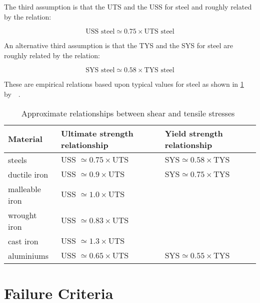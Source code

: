 The third assumption is that the \acf{UTS} and the \acf{USS} for steel and roughly related by the relation:

\begin{equation}
  \text{USS steel} \simeq 0.75 \times \text{UTS steel}
\end{equation}

An alternative third assumption is that the \acf{TYS} and the \acf{SYS} for steel are roughly related by the relation:

\begin{equation}
  \text{SYS steel} \simeq 0.58 \times \text{TYS steel}
\end{equation}

These are empirical relations based upon typical values for steel as shown in \cref{tbl-uts-relationships} by~\citet{deutschman1975}~\cite{deutschman1975}.

\begin{table}
  \caption[Approximate relationships between shear and tensile stresses]{Approximate relationships between shear and tensile stresses~\citep{deutschman1975}}
  \label{tbl-uts-relationships}
  \center{}
  \small
  \begin{tabular}{p{} p{} p{}}
    \toprule
    Material & Ultimate strength relationship & Yield strength relationship \\
    \midrule
    steels & \(\text{USS } \simeq 0.75 \times \text{UTS}\) & \(\text{SYS} \simeq 0.58 \times \text{TYS}\) \\
    ductile iron & \(\text{USS } \simeq 0.9 \times \text{UTS}\) & \(\text{SYS} \simeq 0.75 \times \text{TYS}\) \\
    malleable iron & \(\text{USS } \simeq 1.0 \times \text{UTS}\) &  \\
    wrought iron & \(\text{USS } \simeq 0.83 \times \text{UTS}\) &  \\
    cast iron & \(\text{USS } \simeq 1.3 \times \text{UTS}\) &  \\
    aluminiums & \(\text{USS } \simeq 0.65 \times \text{UTS}\) & \(\text{SYS} \simeq 0.55 \times \text{TYS}\) \\
    \bottomrule
  \end{tabular}
\end{table}

\section{Failure Criteria}

